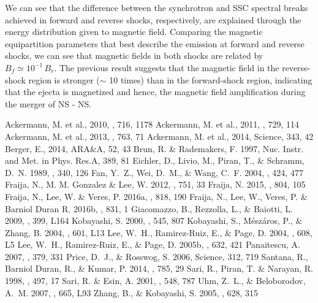 \documentclass[11pt,twoside]{article}
\begin{document}
%
We can see that the difference between the synchrotron and SSC spectral breaks achieved in forward and reverse shocks, respectively,  are explained through the energy distribution given to magnetic field.  Comparing the magnetic equipartition parameters that best describe the emission at forward and reverse shocks, we can see that magnetic fields in both shocks are related by  $B_f\simeq 10^{-1}\,B_r$. The previous result suggests that the magnetic field in the reverse-shock region is stronger ($\sim$ 10 times) than in the forward-shock region,  indicating that the ejecta is magnetized and hence, the magnetic field amplification during the merger of NS - NS.
%
\begin{references}
 Ackermann, M. et al., 2010, \apj, 716, 1178
 Ackermann, M. et al., 2011, \apj, 729, 114
 Ackermann, M. et al., 2013, \apj, 763, 71
 Ackermann, M. et al., 2014, Science, 343, 42
 Berger, E., 2014, ARA\&A, 52, 43
 Brun, R. \& Rademakers, F. 1997,  Nuc. Instr. and Met. in Phys. Res.A, 389, 81
 Eichler, D., Livio, M., Piran, T., \& Schramm, D.~N. 1989, \nat, 340, 126
 Fan, Y.~Z., Wei, D.~M., \& Wang, C.~F. 2004, \aap, 424, 477
 Fraija, N., M. M. Gonzalez \& Lee, W.  2012, \apj, 751, 33
 Fraija, N. 2015, \apj, 804, 105
 Fraija, N., Lee, W. \& Veres, P.  2016a, \apj, 818, 190
 Fraija, N., Lee, W., Veres, P.  \& Barniol Duran R.  2016b,  \apj, 831, 1
 Giacomazzo, B., Rezzolla, L., \& Baiotti, L. 2009, \mnras, 399, L164
 Kobayashi, S. 2000, \apj, 545, 807
 Kobayashi, S., M{\'e}sz{\'a}ros, P., \& Zhang, B. 2004, \apjl, 601, L13
 Lee, W.~H., Ramirez-Ruiz, E., \& Page, D. 2004, \apjl, 608, L5
 Lee, W.~H., Ramirez-Ruiz, E., \& Page, D. 2005b, \apj, 632, 421
 Panaitescu, A. 2007, \mnras, 379, 331
 Price, D.~J., \& Rosswog, S. 2006, Science, 312, 719
 Santana, R., Barniol Duran, R., \& Kumar, P. 2014, \apj, 785, 29
 Sari, R., Piran, T. \& Narayan, R. 1998, \apjl, 497, 17
 Sari, R. \& Esin, A. 2001, \apj, 548, 787
 Uhm, Z.~L., \& Beloborodov, A.~M. 2007, \apjl, 665, L93
 Zhang, B., \& Kobayashi, S. 2005, \apj, 628, 315
\end{references}
\end{document}
